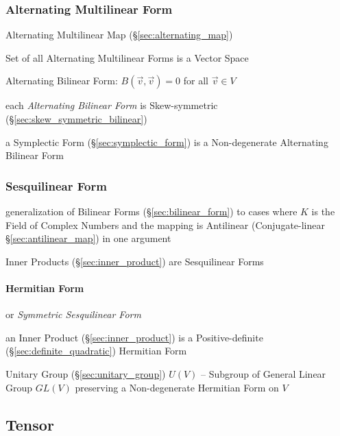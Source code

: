 {{\subsubsection{Alternating Multilinear Form}\label{sec:alternating_form}

Alternating Multilinear Map (\S\ref{sec:alternating_map})

Set of all Alternating Multilinear Forms is a Vector Space

Alternating Bilinear Form: $B(\vec{v},\vec{v}) = 0$ for all $\vec{v} \in V$

each \emph{Alternating Bilinear Form} is Skew-symmetric
(\S\ref{sec:skew_symmetric_bilinear})

a Symplectic Form (\S\ref{sec:symplectic_form}) is a Non-degenerate Alternating
Bilinear Form



\subsubsection{Sesquilinear Form}\label{sec:sesquilinear_form}

generalization of Bilinear Forms (\S\ref{sec:bilinear_form}) to cases where $K$
is the Field of Complex Numbers and the mapping is Antilinear (Conjugate-linear
\S\ref{sec:antilinear_map}) in one argument

Inner Products (\S\ref{sec:inner_product}) are Sesquilinear Forms



\paragraph{Hermitian Form}\label{sec:hermitian_form}\hfill

or \emph{Symmetric Sesquilinear Form}

an Inner Product (\S\ref{sec:inner_product}) is a Positive-definite
(\S\ref{sec:definite_quadratic}) Hermitian Form

Unitary Group (\S\ref{sec:unitary_group}) $U(V)$ -- Subgroup of General Linear
Group $GL(V)$ preserving a Non-degenerate Hermitian Form on $V$



\subsection{Tensor}\label{sec:tensor}

}}
